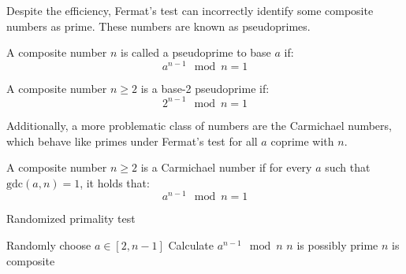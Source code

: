 Despite the efficiency, Fermat's test can incorrectly identify some composite numbers as prime. 
These numbers are known as pseudoprimes.
\begin{definition}
    A composite number $n$ is called a pseudoprime to base $a$ if: 
    \[a^{n-1}\mod n = 1\]
\end{definition}
\begin{definition}
    A composite number $n\geq 2$ is a base-2 pseudoprime if:
    \[2^{n-1}\mod n = 1\]
\end{definition}
Additionally, a more problematic class of numbers are the Carmichael numbers, which behave like primes under Fermat's test for all $a$ coprime with $n$. 
\begin{definition}
    A composite number $n\geq 2$ is a Carmichael number if for every $a$  such that $\text{gdc}(a, n) = 1$, it holds that: 
    \[a^{n-1} \mod n = 1\]
\end{definition}
\begin{algorithm}[H]
    \caption{Randomized primality test}
    \begin{algorithmic}[1]
        \State Randomly choose $a\in[2,n-1]$
        \State Calculate $a^{n-1}\mod n$
            \State $n$ is possibly prime 
        \Else 
            \State $n$ is composite
        \EndIf
    \end{algorithmic}
\end{algorithm} 

